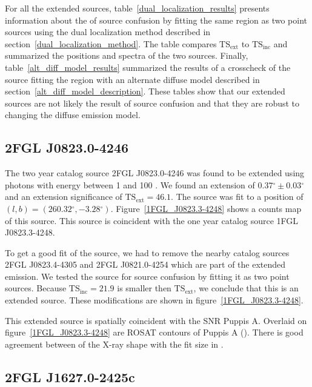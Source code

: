 \documentclass[12pt,preprint]{aastex}
\newcommand{\gev}{\text{GeV}\xspace}
\newcommand{\tsext}{{\ensuremath{\text{TS}_\text{ext}}}\xspace}
\newcommand{\tsinc}{\ensuremath{\text{TS}_\text{inc}}\xspace}
\renewcommand{\deg}{\ensuremath{^\circ}\xspace}
\begin{document}
For all the extended sources, table~\ref{dual_localization_results}
presents information about the of source confusion by fitting the same
region as two point sources using the dual localization method described
in section~\ref{dual_localization_method}. The table compares \tsext
to \tsinc and summarized the positions and spectra of the two sources.
Finally, table~\ref{alt_diff_model_results} summarized the results of
a crosscheck of the source fitting the region with an alternate diffuse
model described in section~\ref{alt_diff_model_description}.  These tables
show that our extended sources are not likely the result of source confusion
and that they are robust to changing the diffuse emission model.


\subsection{2FGL J0823.0-4246}
\label{section_2FGL_J0823.0-4246}


The two year catalog source 2FGL J0823.0-4246 was found to be
extended using photons with energy between 1 \gev and 100 \gev.
We found an extension of $0.37\deg\pm0.03\deg$ and an extension
significance of $\tsext=46.1$.  The source was fit to a position of
$(l,b)=(260.32\deg,-3.28\deg)$.  Figure~\ref{1FGL_J0823.3-4248} shows a
counts map of this source.  This source is coincident with the one year
catalog source 1FGL J0823.3-4248.

To get a good fit of the source, we had to remove the nearby catalog
sources 2FGL J0823.4-4305 and 2FGL J0821.0-4254 which are part of the
extended emission.  We tested the source for source confusion by fitting
it as two point sources. Because $\tsinc=21.9$ is smaller then \tsext,
we conclude that this is an extended source.  
These modifications are shown in
figure~\ref{1FGL_J0823.3-4248}.

This extended source is spatially coincident with the SNR Puppis A.
Overlaid on figure~\ref{1FGL_J0823.3-4248} are ROSAT contours of Puppis
A (\cite{rosat_puppis_a}). There is good agreement between of the X-ray
shape with the fit size in \gev.


\subsection{2FGL J1627.0-2425c}
\label{section_2FGL_J1627.0-2425c}
\end{document}
